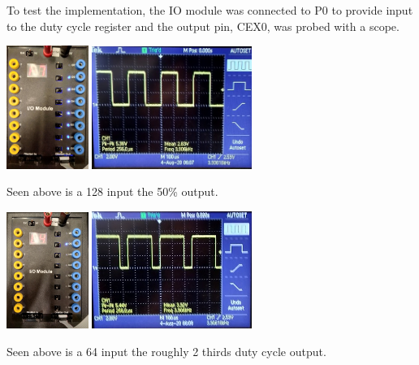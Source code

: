 \documentclass[11pt]{article}
\begin{document}
\begin{preview}
        To test the implementation, the IO module was connected to P0 to provide input to the duty cycle register and the output pin, CEX0, was probed with a scope.

        \begin{center}
          \includegraphics[width=0.2\textwidth]{inc/pwm_IP0.jpg}
          \includegraphics[width=0.39\textwidth]{inc/pwm_OP0.jpg}
        \end{center}

        Seen above is a 128 input the 50\% output.

        \begin{center}
          \includegraphics[width=0.2\textwidth]{inc/pwm_IP1.jpg}
          \includegraphics[width=0.39\textwidth]{inc/pwm_OP1.jpg}
        \end{center}
        
        Seen above is a 64 input the roughly 2 thirds duty cycle output.



\end{preview}
\end{document}
